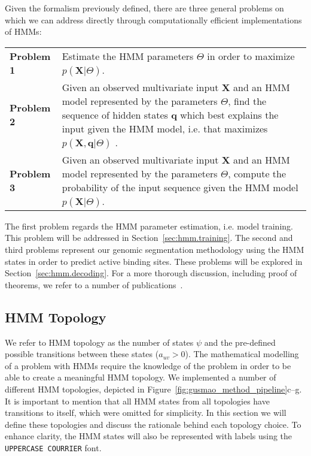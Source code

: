Given the formalism previously defined, there are three general problems on which we can address directly through computationally efficient implementations of HMMs:

\begin{center}
  \begin{tabular}{lp{.8\linewidth}}
    {\bf Problem 1} & Estimate the HMM parameters $ \Theta $ in order to maximize $p(\mathbf{X} | \Theta)$. \\[0.2cm]
    {\bf Problem 2} & Given an observed multivariate input $ \mathbf{X} $ and an HMM model represented by the parameters $ \Theta $, find the sequence of hidden states $ \mathbf{q} $ which best explains the input given the HMM model, i.e. that maximizes $ p\left( \mathbf{X}, \mathbf{q} | \Theta \right) $ . \\[0.2cm]
    {\bf Problem 3} & Given an observed multivariate input $ \mathbf{X} $ and an HMM model represented by the parameters $ \Theta $, compute the probability of the input sequence given the HMM model $p(\mathbf{X} | \Theta)$. \\[0.2cm]
  \end{tabular}
\end{center}

The first problem regards the HMM parameter estimation, i.e. model training. This problem will be addressed in Section~\ref{sec:hmm.training}. The second and third problems represent our genomic segmentation methodology using the HMM states in order to predict active binding sites. These problems will be explored in Section~\ref{sec:hmm.decoding}. For a more thorough discussion, including proof of theorems, we refer to a number of publications~\cite{rabiner1989,durbin1998,mitchell1997,bishop2006,duda2000}.

\subsection{HMM Topology}
\label{sec:hmm.topology}

We refer to HMM topology as the number of states $\psi$ and the pre-defined possible transitions between these states ($a_{uv} > 0$). The mathematical modelling of a problem with HMMs require the knowledge of the problem in order to be able to create a meaningful HMM topology. We implemented a number of different HMM topologies, depicted in Figure~\ref{fig:gusmao_method_pipeline}c--g. It is important to mention that all HMM states from all topologies have transitions to itself, which were omitted for simplicity. In this section we will define these topologies and discuss the rationale behind each topology choice. To enhance clarity, the HMM states will also be represented with labels using the {\tt UPPERCASE COURRIER} font.


